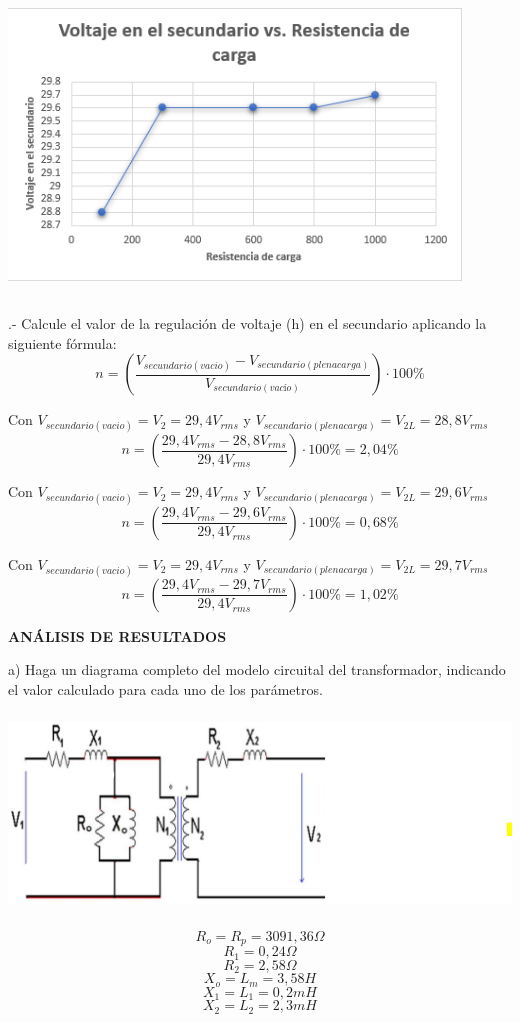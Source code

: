 \documentclass[12pt]{article}
\begin{document}
	\begin{center}
		\includegraphics[width=12cm,height=8cm]{Img/grafo3}\\
	\end{center}
	
	.- Calcule el valor de la regulación de voltaje (h) en el secundario aplicando la siguiente	fórmula: $$n = (\frac{V_{secundario(vacio)} - V_{secundario(plena carga)}}{V_{secundario(vacío)}}) \cdot 100\%$$
	
	Con $V_{secundario(vacio)} = V_{2} = 29,4 V_{rms}$ y $V_{secundario(plena carga)} = V_{2L} = 28,8 V_{rms}$ $$n = (\frac{29,4 V_{rms} - 28,8 V_{rms}}{29,4 V_{rms}}) \cdot 100\% = 2,04\% $$
	
	Con $V_{secundario(vacio)} = V_{2} = 29,4 V_{rms}$ y $V_{secundario(plena carga)} = V_{2L} = 29,6 V_{rms}$ $$n = (\frac{29,4 V_{rms} - 29,6 V_{rms}}{29,4 V_{rms}}) \cdot 100\% = 0,68\% $$
	
	Con $V_{secundario(vacio)} = V_{2} = 29,4 V_{rms}$ y $V_{secundario(plena carga)} = V_{2L} = 29,7 V_{rms}$ $$n = (\frac{29,4 V_{rms} - 29,7 V_{rms}}{29,4 V_{rms}}) \cdot 100\% = 1,02\% $$
		
	\newpage
	
	\begin{center}
		\textbf{\large ANÁLISIS DE RESULTADOS}\\
	\end{center}
	
	a) Haga un diagrama completo del modelo circuital del transformador, indicando el valor calculado para cada uno de los parámetros.\\
	
	\includegraphics[width=22cm,height=6cm]{Img/transformador}\\
	$$R_{o} = R_{p} = 3091,36 \Omega$$
	$$R_{1} = 0,24 \Omega$$
	$$R_{2} = 2,58 \Omega$$
	$$X_{o} = L_{m} = 3,58 H$$
	$$X_{1} = L_{1} = 0,2 mH$$
	$$X_{2} = L_{2} = 2,3 mH$$
	
\end{document}
